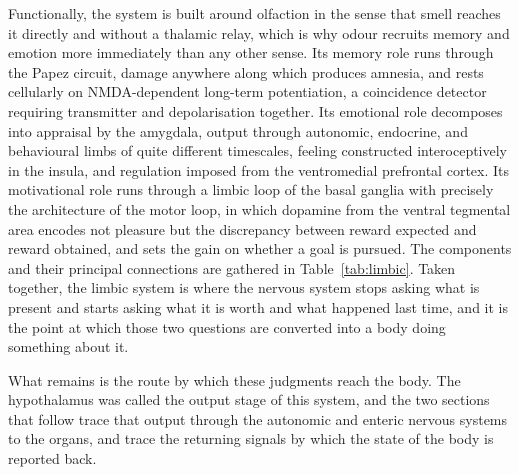 \documentclass[11pt]{article}
\begin{document}
Functionally, the system is built around olfaction in the sense that smell reaches it directly and without a thalamic relay, which is why odour recruits memory and emotion more immediately than any other sense. Its memory role runs through the Papez circuit, damage anywhere along which produces amnesia, and rests cellularly on NMDA-dependent long-term potentiation, a coincidence detector requiring transmitter and depolarisation together. Its emotional role decomposes into appraisal by the amygdala, output through autonomic, endocrine, and behavioural limbs of quite different timescales, feeling constructed interoceptively in the insula, and regulation imposed from the ventromedial prefrontal cortex. Its motivational role runs through a limbic loop of the basal ganglia with precisely the architecture of the motor loop, in which dopamine from the ventral tegmental area encodes not pleasure but the discrepancy between reward expected and reward obtained, and sets the gain on whether a goal is pursued. The components and their principal connections are gathered in Table~\ref{tab:limbic}. Taken together, the limbic system is where the nervous system stops asking what is present and starts asking what it is worth and what happened last time, and it is the point at which those two questions are converted into a body doing something about it.

What remains is the route by which these judgments reach the body. The hypothalamus was called the output stage of this system, and the two sections that follow trace that output through the autonomic and enteric nervous systems to the organs, and trace the returning signals by which the state of the body is reported back.
\end{document}
